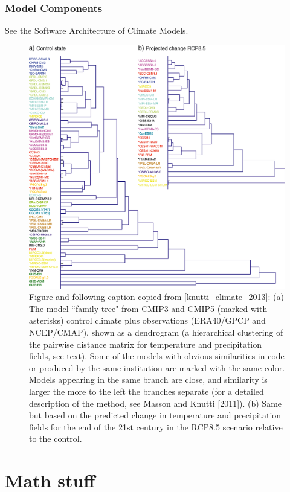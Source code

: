 \documentclass{article}
\begin{document}
\subsubsection{Model Components}
See the Software Architecture of Climate Models. 
\begin{figure}[h]
\includegraphics[width=\textwidth]{Knutti_family_tree.png}
\caption{Figure and following caption copied from \ref{knutti_climate_2013}: (a) The model ``family tree" from CMIP3 and CMIP5 (marked with asterisks) control climate plus observations (ERA40/GPCP and NCEP/CMAP), shown as a dendrogram (a hierarchical clustering of the pairwise distance matrix for temperature and precipitation fields, see text). Some of the models with obvious similarities in code or produced by the same institution are marked with the same color. Models appearing in the same branch are close, and similarity is larger the more to the left the branches separate (for a detailed description of the method, see Masson and Knutti [2011]). (b) Same but based on the predicted change in temperature and precipitation fields for the end of the 21st century in the RCP8.5 scenario relative to the control.}
\end{figure} 


\section{Math stuff}
\end{document}
